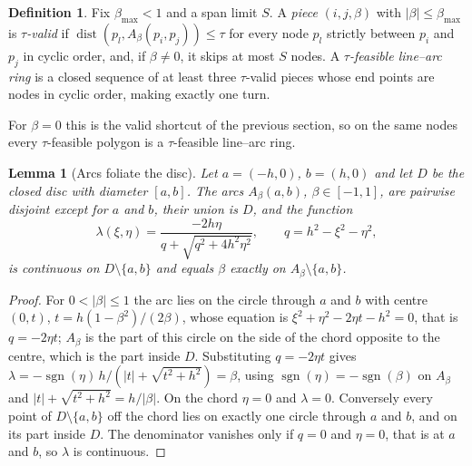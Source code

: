 \documentclass[11pt,a4paper]{article}
\newtheorem{lemma}[theorem]{Lemma}
\theoremstyle{definition}
\newtheorem{definition}[theorem]{Definition}
\theoremstyle{remark}
\newcommand{\dist}{\operatorname{dist}}
\newcommand{\seg}[2]{[#1,#2]}
\begin{document}
\begin{definition}\label{def:arcvalid}
Fix $\beta_{\max}<1$ and a span limit $S$. A \emph{piece} $(i,j,\beta)$ with
$\lvert\beta\rvert\le\beta_{\max}$ is \emph{$\tau$-valid} if
$\dist(p_l,A_\beta(p_i,p_j))\le\tau$ for every node $p_l$ strictly between
$p_i$ and $p_j$ in cyclic order, and, if $\beta\ne0$, it skips at most $S$
nodes. A \emph{$\tau$-feasible line--arc ring} is a closed sequence of at
least three $\tau$-valid pieces whose end points are nodes in cyclic order,
making exactly one turn.
\end{definition}

For $\beta=0$ this is the valid shortcut of the previous section, so on the
same nodes every $\tau$-feasible polygon is a $\tau$-feasible line--arc ring.

\begin{lemma}[Arcs foliate the disc]\label{lem:foliation}
Let $a=(-h,0)$, $b=(h,0)$ and let $D$ be the closed disc with diameter
$\seg ab$. The arcs $A_\beta(a,b)$, $\beta\in[-1,1]$, are pairwise disjoint
except for $a$ and $b$, their union is $D$, and the function
\[
  \lambda(\xi,\eta)=\frac{-2h\eta}{q+\sqrt{q^{2}+4h^{2}\eta^{2}}},\qquad
  q=h^{2}-\xi^{2}-\eta^{2},
\]
is continuous on $D\setminus\{a,b\}$ and equals $\beta$ exactly on
$A_\beta\setminus\{a,b\}$.
\end{lemma}
\begin{proof}
For $0<\lvert\beta\rvert\le1$ the arc lies on the circle through $a$ and $b$
with centre $(0,t)$, $t=h(1-\beta^{2})/(2\beta)$, whose equation is
$\xi^{2}+\eta^{2}-2\eta t-h^{2}=0$, that is $q=-2\eta t$; $A_\beta$ is the part
of this circle on the side of the chord opposite to the centre, which is the
part inside $D$. Substituting $q=-2\eta t$ gives
$\lambda=-\operatorname{sgn}(\eta)\,h/(\lvert t\rvert+\sqrt{t^{2}+h^{2}})
=\beta$, using $\operatorname{sgn}(\eta)=-\operatorname{sgn}(\beta)$ on
$A_\beta$ and $\lvert t\rvert+\sqrt{t^{2}+h^{2}}=h/\lvert\beta\rvert$. On the
chord $\eta=0$ and $\lambda=0$. Conversely every point of
$D\setminus\{a,b\}$ off the chord lies on exactly one circle through $a$ and
$b$, and on its part inside $D$. The denominator vanishes only if $q=0$ and
$\eta=0$, that is at $a$ and $b$, so $\lambda$ is continuous.
\end{proof}
\end{document}
